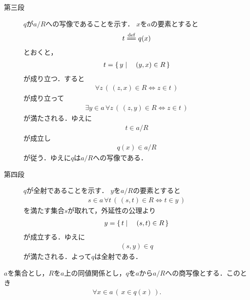 \begin{prf}
\begin{description}
		\item[第三段] $q$が$a/R$への写像であることを示す．
			$x$を$a$の要素とすると
			\begin{align}
				t \defeq q(x)
			\end{align}
			とおくと，
			\begin{align}
				t = \left\{\, y \mid \quad (y,x) \in R\, \right\}
			\end{align}
			が成り立つ．すると
			\begin{align}
				\forall z\, \left(\, (z,x) \in R \Longleftrightarrow z \in t\, \right)
			\end{align}
			が成り立って
			\begin{align}
				\exists y \in a\, \forall z\, \left(\, (z,y) \in R \Longleftrightarrow z \in t\, \right)
			\end{align}
			が満たされる．ゆえに
			\begin{align}
				t \in a/R
			\end{align}
			が成立し
			\begin{align}
				q(x) \in a/R
			\end{align}
			が従う．ゆえに$q$は$a/R$への写像である．
			
		\item[第四段] $q$が全射であることを示す．
			$y$を$a/R$の要素とすると
			\begin{align}
				s \in a\, \forall t\, \left(\, (s,t) \in R \Longleftrightarrow t \in y\, \right)
			\end{align}
			を満たす集合$s$が取れて，外延性の公理より
			\begin{align}
				y = \left\{\, t \mid \quad (s,t) \in R\, \right\}
			\end{align}
			が成立する．ゆえに
			\begin{align}
				(s,y) \in q
			\end{align}
			が満たされる．よって$q$は全射である．
			\QED
		\end{description}
	\end{prf}
	
	\begin{screen}
		\begin{thm}[要素は自分の同値類に属する]\label{thm:element_is_contained_in_its_equivalence_class}
			$a$を集合とし，$R$を$a$上の同値関係とし，$q$を$a$から$a/R$への商写像とする．このとき
			\begin{align}
				\forall x \in a\, (\, x \in q(x)\, ).
			\end{align}
		\end{thm}
	\end{screen}
	
